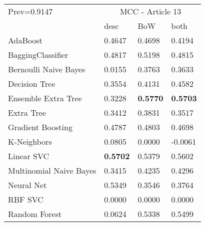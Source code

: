 \begin{tabular}{|l|l|l|l| }
\hline
Prev=0.9147 &  \multicolumn{3}{c|}{MCC - Article 13} \\
\cline{2-4} & desc & BoW & both \\ \hline
AdaBoost                & 0.4647 & 0.4698 & 0.4194\\
BaggingClassifier       & 0.4817 & 0.5198 & 0.4815\\
Bernoulli Naive Bayes   & 0.0155 & 0.3763 & 0.3633\\
Decision Tree           & 0.3554 & 0.4131 & 0.4582\\
Ensemble Extra Tree     & 0.3228 & {\bf 0.5770} & {\bf 0.5703}\\
Extra Tree              & 0.3412 & 0.3831 & 0.3517\\
Gradient Boosting       & 0.4787 & 0.4803 & 0.4698\\
K-Neighbors             & 0.0805 & 0.0000 & -0.0061\\
Linear SVC              & {\bf 0.5702} & 0.5379 & 0.5602\\
Multinomial Naive Bayes & 0.3415 & 0.4235 & 0.4296\\
Neural Net              & 0.5349 & 0.3546 & 0.3764\\
RBF SVC                 & 0.0000 & 0.0000 & 0.0000\\
Random Forest           & 0.0624 & 0.5338 & 0.5499\\
\hline
\end{tabular}